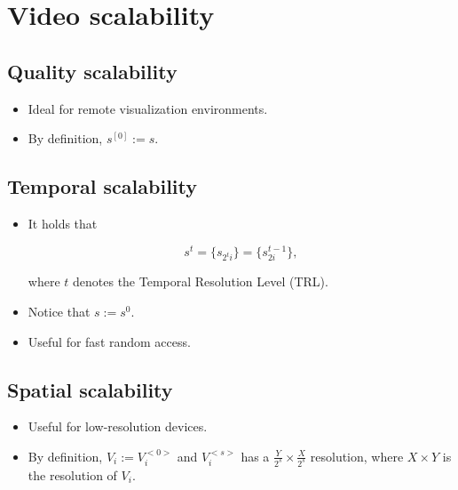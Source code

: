 \section{Video scalability}
\subsection{Quality scalability}
\begin{itemize}
\item
  Ideal for remote visualization environments.
\item
  By definition, \(s^{[0]}:=s\).
\end{itemize}

\subsection{Temporal scalability}
\begin{itemize}
\item
  It holds that

  \begin{equation}
    s^{t}=\{s_{2^t i}\}=\{s_{2i}^{t-1}\},
  \end{equation}

  where \(t\) denotes the Temporal Resolution Level (TRL).
\item
  Notice that \(s:=s^{0}\).
\item
  Useful for fast random access.
\end{itemize}

\subsection{Spatial scalability}
\begin{itemize}
\item
  Useful for low-resolution devices.
\item
  By definition, \(V_i:=V_i^{<0>}\) and \(V_i^{<s>}\) has a
  \(\frac{Y}{2^s}\times \frac{X}{2^s}\) resolution, where \(X\times Y\)
  is the resolution of \(V_i\).
\end{itemize}



